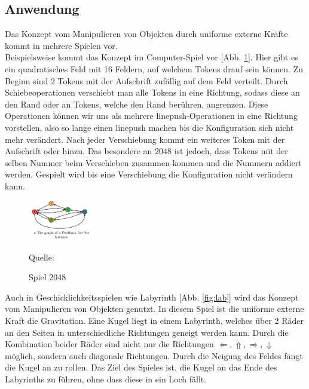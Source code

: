 \documentclass[seminar,german]{algothesis}
\newcommand*{\quelle}{%
  \footnotesize Quelle:
}
\begin{document}
\newpage
\subsection{Anwendung}
Das Konzept vom Manipulieren von Objekten durch uniforme externe Kräfte kommt in mehrere Spielen vor.\\
Beispielsweise kommt das Konzept im Computer-Spiel \grqq{} vor [Abb. \ref{fig:2}]. Hier gibt es ein quadratisches Feld mit 16 Feldern, auf welchem Tokens drauf sein können. Zu Beginn sind 2 Tokens mit der Aufschrift \grqq{} zufällig auf dem Feld verteilt. Durch Schiebeoperationen verschiebt man alle Tokens in eine Richtung, sodass diese an den Rand oder an Tokens, welche den Rand berühren, angrenzen. Diese Operationen können wir uns als mehrere linepush-Operationen in eine Richtung vorstellen, also so lange einen linepush machen bis die Konfiguration sich nicht mehr verändert. Nach jeder Verschiebung kommt ein weiteres Token mit der Aufschrift \grqq{} oder \grqq{} hinzu. Das besondere an 2048 ist jedoch, dass Tokens mit der selben Nummer beim Verschieben zusammen kommen und die Nummern addiert werden. Gespielt wird bis eine Verschiebung die Konfiguration nicht verändern kann.


\begin{figure}[ht]
	\centering
	\includegraphics[width=0.25\textwidth]{graph}
	\caption{Spiel 2048}
	\quelle\cite{2048}
	\label{fig:2}
\end{figure}

\noindent
Auch in Geschicklichkeitsspielen wie \glqq Labyrinth\grqq{} [Abb. \ref{fig:lab}] wird das Konzept vom Manipulieren von Objekten genutzt. In diesem Spiel ist die uniforme externe Kraft die Gravitation. Eine Kugel liegt in einem Labyrinth, welches über 2 Räder an den Seiten in unterschiedliche Richtungen geneigt werden kann. Durch die Kombination beider Räder sind nicht nur die Richtungen $\Leftarrow, \Uparrow, \Rightarrow, \Downarrow$ möglich, sondern auch diagonale Richtungen. Durch die Neigung des Feldes fängt die Kugel an zu rollen. Das Ziel des Spieles ist, die Kugel an das Ende des Labyrinths zu führen, ohne dass diese in ein Loch fällt.
\end{document}
